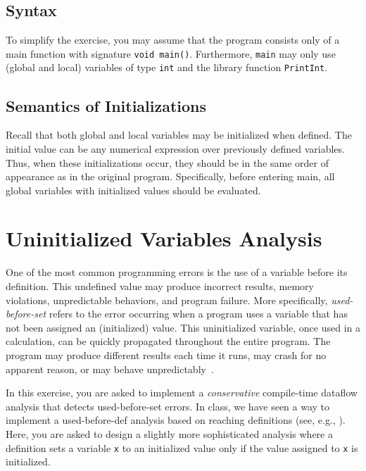 \documentclass{article}
\begin{document}
\subsection{Syntax}
To simplify the exercise, you may assume that the program consists only of a main function with signature \texttt{void main()}.
Furthermore, \texttt{main} may only use (global and local) variables of type \texttt{int} and the library function \texttt{PrintInt}.

\subsection{Semantics of Initializations}
Recall that both global and local variables may be initialized when defined.
The initial value can be any numerical expression over previously defined variables.
Thus, when these initializations occur, they should be in the same order of appearance as in the original program.
Specifically, before entering main, all global variables with initialized values should be evaluated.
 
\section{Uninitialized Variables Analysis}

One of the most common programming errors is the use of a variable before its definition.
This undefined value may produce incorrect results, memory violations, unpredictable behaviors, and program failure.
More specifically, \emph{used-before-set} refers to the error occurring when a program uses a variable that has not been assigned an (initialized) value.
This uninitialized variable, once used in a calculation, can be quickly propagated throughout the entire program.
The program may produce different results each time it runs, may crash for no apparent reason, or may behave unpredictably~\cite{uninitvar}. 

In this exercise, you are asked to implement a \emph{conservative} compile-time dataflow analysis that detects used-before-set errors.
In class, we have seen a way to implement a used-before-def analysis based on reaching definitions (see, e.g., \cite[Sec. 9.2.4]{dragonbook}).
Here, you are asked to design a slightly more sophisticated analysis where a definition sets a variable \texttt{x} to an initialized value only if the value assigned to \texttt{x}  is initialized.
\end{document}

